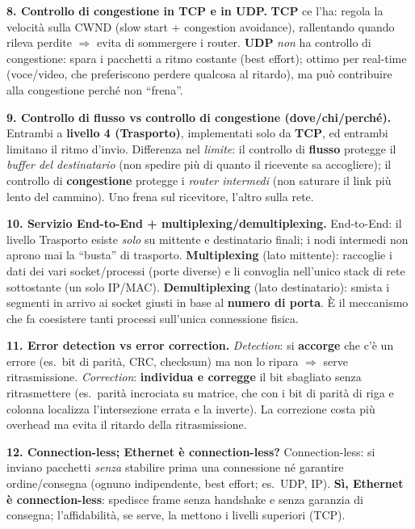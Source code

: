 \documentclass[11pt,a4paper]{report}
\begin{document}
\textbf{8. Controllo di congestione in TCP e in UDP.} \textbf{TCP} ce l'ha: regola
la velocità sulla CWND (slow start + congestion avoidance), rallentando quando
rileva perdite $\Rightarrow$ evita di sommergere i router. \textbf{UDP} \emph{non}
ha controllo di congestione: spara i pacchetti a ritmo costante (best effort);
ottimo per real-time (voce/video, che preferiscono perdere qualcosa al ritardo),
ma può contribuire alla congestione perché non ``frena''.

\textbf{9. Controllo di flusso vs controllo di congestione (dove/chi/perché).}
Entrambi a \textbf{livello 4 (Trasporto)}, implementati solo da \textbf{TCP}, ed
entrambi limitano il ritmo d'invio. Differenza nel \emph{limite}: il controllo di
\textbf{flusso} protegge il \emph{buffer del destinatario} (non spedire più di
quanto il ricevente sa accogliere); il controllo di \textbf{congestione} protegge
i \emph{router intermedi} (non saturare il link più lento del cammino). Uno frena
sul ricevitore, l'altro sulla rete.

\textbf{10. Servizio End-to-End + multiplexing/demultiplexing.} End-to-End: il
livello Trasporto esiste \emph{solo} su mittente e destinatario finali; i nodi
intermedi non aprono mai la ``busta'' di trasporto. \textbf{Multiplexing} (lato
mittente): raccoglie i dati dei vari socket/processi (porte diverse) e li convoglia
nell'unico stack di rete sottostante (un solo IP/MAC). \textbf{Demultiplexing}
(lato destinatario): smista i segmenti in arrivo ai socket giusti in base al
\textbf{numero di porta}. È il meccanismo che fa coesistere tanti processi
sull'unica connessione fisica.

\textbf{11. Error detection vs error correction.} \emph{Detection}: si
\textbf{accorge} che c'è un errore (es.\ bit di parità, CRC, checksum) ma non lo
ripara $\Rightarrow$ serve ritrasmissione. \emph{Correction}: \textbf{individua e
corregge} il bit sbagliato senza ritrasmettere (es.\ parità incrociata su
matrice, che con i bit di parità di riga e colonna localizza l'intersezione
errata e la inverte). La correzione costa più overhead ma evita il ritardo della
ritrasmissione.

\textbf{12. Connection-less; Ethernet è connection-less?} Connection-less: si
inviano pacchetti \emph{senza} stabilire prima una connessione né garantire
ordine/consegna (ognuno indipendente, best effort; es.\ UDP, IP). \textbf{Sì,
Ethernet è connection-less}: spedisce frame senza handshake e senza garanzia di
consegna; l'affidabilità, se serve, la mettono i livelli superiori (TCP).
\end{document}
